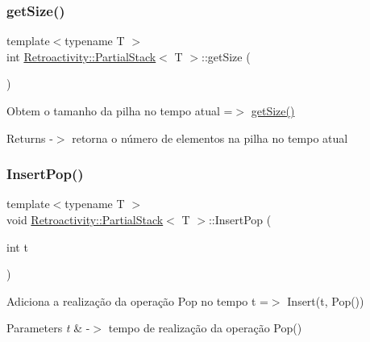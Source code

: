 \subsubsection{\texorpdfstring{get\+Size()}{getSize()}}
{\footnotesize\ttfamily template$<$typename T $>$ \\
int \hyperlink{classRetroactivity_1_1PartialStack}{Retroactivity\+::\+Partial\+Stack}$<$ T $>$\+::get\+Size (\begin{DoxyParamCaption}{ }\end{DoxyParamCaption})}

Obtem o tamanho da pilha no tempo atual =$>$ \hyperlink{classRetroactivity_1_1PartialStack_a770d2d1ebb3e72296caeef6876f37a54}{get\+Size()}

\begin{DoxyReturn}{Returns}
-\/$>$ retorna o número de elementos na pilha no tempo atual 
\end{DoxyReturn}
\mbox{\label{classRetroactivity_1_1PartialStack_a54fffb09c5aca4b6dba7c6fb62af1302}} 
\subsubsection{\texorpdfstring{Insert\+Pop()}{InsertPop()}}
{\footnotesize\ttfamily template$<$typename T $>$ \\
void \hyperlink{classRetroactivity_1_1PartialStack}{Retroactivity\+::\+Partial\+Stack}$<$ T $>$\+::Insert\+Pop (\begin{DoxyParamCaption}\item[{int}]{t }\end{DoxyParamCaption})}

Adiciona a realização da operação Pop no tempo t =$>$ Insert(t, Pop())


\begin{DoxyParams}{Parameters}
{\em t} & -\/$>$ tempo de realização da operação Pop() \\
\hline
\end{DoxyParams}
\mbox{\label{classRetroactivity_1_1PartialStack_afe78dbdae52e05e0a006017528d74088}} 
